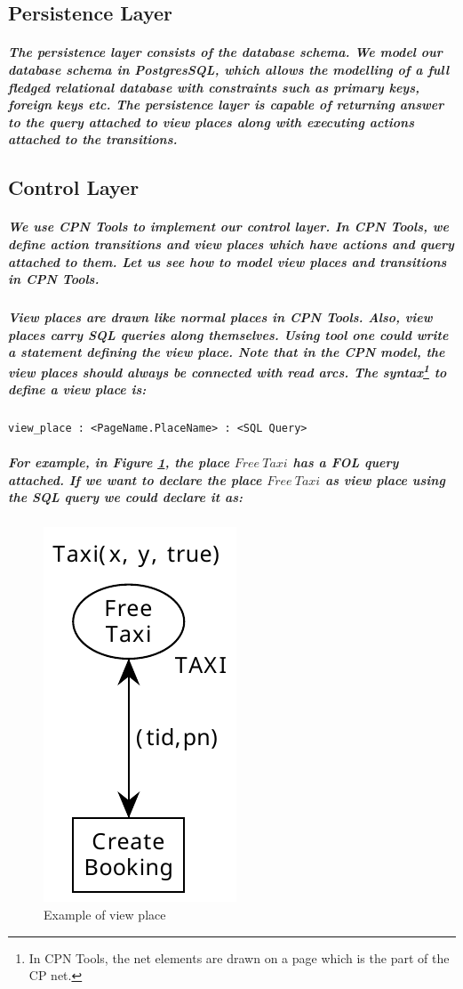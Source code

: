 \subsection{Persistence Layer}
\subparagraph*{\textnormal{The persistence layer consists of the database schema. We model our database schema in PostgresSQL, which allows the modelling of a full fledged relational database with constraints such as primary keys, foreign keys etc. The persistence layer is capable of returning answer to the query attached to view places along with executing actions attached to the transitions.}}

\subsection{Control Layer}
\subparagraph*{\textnormal{We use CPN Tools to implement our control layer. In CPN Tools, we define action transitions and view places which have actions and query attached to them. Let us see how to model view places and transitions in CPN Tools.}}

\subparagraph*{\textnormal{View places are drawn like normal places in CPN Tools. Also, view places carry SQL queries along themselves. Using  tool one could write a statement defining the view place. Note that in the CPN model, the view places should always be connected with read arcs. The syntax\footnote{In CPN Tools, the net elements are drawn on a page which is the part of the CP net.} to define a view place is:}}
\begin{verbatim}
view_place : <PageName.PlaceName> : <SQL Query>
\end{verbatim}

\subparagraph*{\textnormal{For example, in Figure \ref{fig:DBN_Impl_Short_VP_AT_Example}, the place $\mathit{Free\ Taxi}$ has a FOL query attached. If we want to declare the place $\mathit{Free\ Taxi}$ as view place using the SQL query we could declare it as:}}

\begin{figure}[!htbp]
	\centering
	\includegraphics[scale = 0.35]{DBN_Impl_Short_VP_AT_Example.pdf}
	\caption{Example of view place}
	\label{fig:DBN_Impl_Short_VP_AT_Example}
\end{figure}

